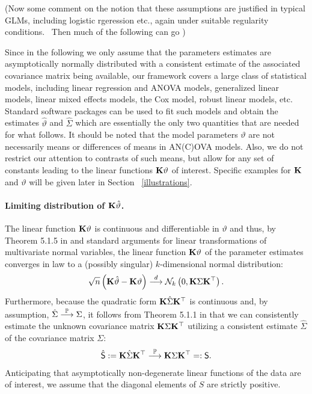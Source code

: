 \documentclass[12pt]{article}
\begin{document}
\bigskip 

(Now some comment on the notion that these assumptions are justified in
typical GLMs, including logistic rgeression etc., again under suitable
regularity conditions. \ Then much of the following can go ) \bigskip 

\bigskip 

Since in the following we only assume that the parameters estimates are
asymptotically normally distributed with a consistent estimate of the
associated covariance matrix being available, our framework covers a large
class of statistical models, including linear regression and ANOVA models,
generalized linear models, linear mixed effects models, the Cox model,
robust linear models, etc. Standard software packages can be used to fit
such models and obtain the estimates $\hat{\vartheta}$ and $\hat{\Sigma}$
which are essentially the only two quantities that are needed for what
follows. It should be noted that the model parameters $\vartheta $ are not
necessarily means or differences of means in AN(C)OVA models. Also, we do
not restrict our attention to contrasts of such means, but allow for any set
of constants leading to the linear functions $\mathbf{K}\vartheta $ of interest.
Specific examples for $\mathbf{K}$ and $\vartheta $ will be given later in Section~%
\ref{illustrations}.

\paragraph{Limiting distribution of $\mathbf{K}\hat{\protect\vartheta}$.}

The linear function $\mathbf{K} \vartheta$ is continuous and differentiable in $%
\vartheta$ and thus, by Theorem 5.1.5 in \cite{Lehmann1999} and standard
arguments for linear transformations of multivariate normal variables, the
linear function $\mathbf{K} \vartheta$ of the parameter estimates converges in law
to a (possibly singular) $k$-dimensional normal distribution: 
\begin{eqnarray}  \label{dist_f}
\sqrt{n} \left(\K \hat{\vartheta} - \K \vartheta\right) \cL \N_k\left(0, \K %
\Sigma \K^\top\right).
\end{eqnarray}
Furthermore, because the quadratic form $\mathbf{K} \hat{\Sigma} \mathbf{K}^\top$ is
continuous and, by assumption, $\hat{\Sigma} \stackrel{\mathbb{P}}{\longrightarrow} \Sigma$, it follows from
Theorem 5.1.1 in \cite{Lehmann1999} that we can consistently estimate the
unknown covariance matrix $\mathbf{K} \Sigma \mathbf{K}^\top$ utilizing a consistent
estimate $\hat{\Sigma}$ of the covariance matrix $\Sigma$: 
\begin{eqnarray*}
\hat{\textsf{S} } := \mathbf{K} \hat{\Sigma} \mathbf{K}^\top \stackrel{\mathbb{P}}{\longrightarrow} \mathbf{K} \Sigma \mathbf{K}^\top =: \textsf{S} .
\end{eqnarray*}
Anticipating that asymptotically non-degenerate linear functions of the data
are of interest, we assume that the diagonal elements of $S$ are strictly
positive.
\end{document}
